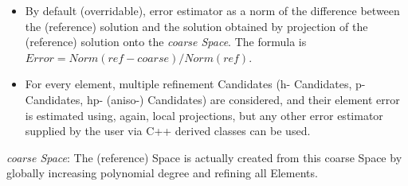 \documentclass{beamer}
\begin{document}
\begin{frame}
\begin{center}
\begin{figure}[t]
\end{figure}
\end{center}
\begin{itemize}
\item
	By default (overridable), error estimator as a norm of the difference between the (reference) solution and the solution obtained by projection of the (reference) solution onto the \emph{coarse Space}. The formula is $Error = Norm\left(ref-coarse\right) / Norm\left(ref\right)$.
\item
	For every element, multiple refinement Candidates (h- Candidates, p- Candidates, hp- (aniso-) Candidates) are considered, and their element error is estimated using, again, local projections, but any other error estimator supplied by the user via C++ derived classes can be used.
\end{itemize}
\small
\emph{coarse Space}: The (reference) Space is actually created from this coarse Space by globally increasing polynomial degree and refining all Elements.
\end{frame}
\end{document}
